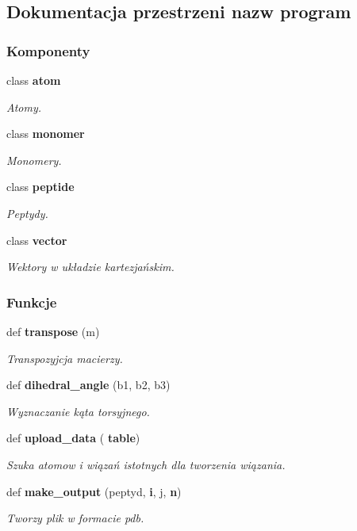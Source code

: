 \subsection{Dokumentacja przestrzeni nazw program}
\label{namespaceprogram}
\subsubsection*{Komponenty}
\begin{DoxyCompactItemize}
\item 
class \textbf{ atom}
\begin{DoxyCompactList}\small\item\em Atomy. \end{DoxyCompactList}\item 
class \textbf{ monomer}
\begin{DoxyCompactList}\small\item\em Monomery. \end{DoxyCompactList}\item 
class \textbf{ peptide}
\begin{DoxyCompactList}\small\item\em Peptydy. \end{DoxyCompactList}\item 
class \textbf{ vector}
\begin{DoxyCompactList}\small\item\em Wektory w układzie kartezjańskim. \end{DoxyCompactList}\end{DoxyCompactItemize}
\subsubsection*{Funkcje}
\begin{DoxyCompactItemize}
\item 
def \textbf{ transpose} (m)
\begin{DoxyCompactList}\small\item\em Transpozyjcja macierzy. \end{DoxyCompactList}\item 
def \textbf{ dihedral\+\_\+angle} (b1, b2, b3)
\begin{DoxyCompactList}\small\item\em Wyznaczanie kąta torsyjnego. \end{DoxyCompactList}\item 
def \textbf{ upload\+\_\+data} (\textbf{ table})
\begin{DoxyCompactList}\small\item\em Szuka atomow i wiązań istotnych dla tworzenia wiązania. \end{DoxyCompactList}\item 
def \textbf{ make\+\_\+output} (peptyd, \textbf{ i}, j, \textbf{ n})
\begin{DoxyCompactList}\small\item\em Tworzy plik w formacie pdb. \end{DoxyCompactList}\end{DoxyCompactItemize}

